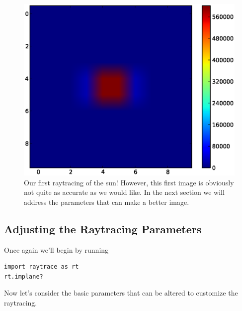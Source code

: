 \documentclass[12pt]{article}
\begin{document}
\begin{figure}[h]
\begin{center}
\includegraphics[scale=.75]{first_tbr}
\end{center}
\caption{Our first raytracing of the sun! However, this first image is
obviously not quite as accurate as we would like. In the next section
we will address the parameters that can make a better image.}
\end{figure}

\subsection{Adjusting the Raytracing Parameters}
\label{params}

Once again we'll begin by running
\begin{lstlisting}
import raytrace as rt
rt.implane?
\end{lstlisting}
Now let's consider the basic parameters that can be altered to customize the
raytracing.
\end{document}
